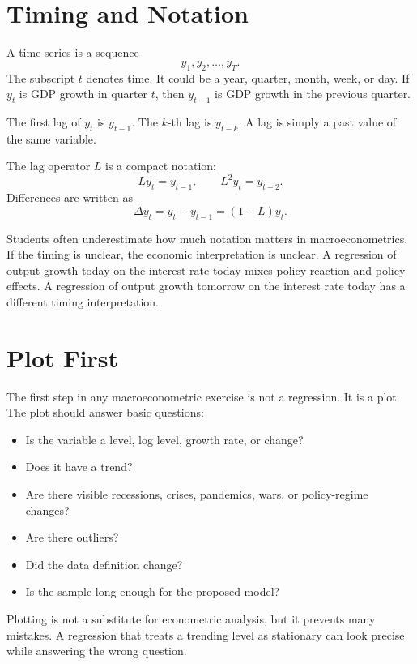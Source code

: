 \section{Timing and Notation}

A time series is a sequence
\[
    y_1,y_2,\ldots,y_T.
\]
The subscript \(t\) denotes time. It could be a year, quarter, month, week, or day. If \(y_t\) is GDP growth in quarter \(t\), then \(y_{t-1}\) is GDP growth in the previous quarter.

\begin{defN}[Lag]
The first lag of \(y_t\) is \(y_{t-1}\). The \(k\)-th lag is \(y_{t-k}\). A lag is simply a past value of the same variable.
\end{defN}

The lag operator \(L\) is a compact notation:
\[
    Ly_t=y_{t-1},\qquad L^2y_t=y_{t-2}.
\]
Differences are written as
\[
    \Delta y_t=y_t-y_{t-1}=(1-L)y_t.
\]

Students often underestimate how much notation matters in macroeconometrics. If the timing is unclear, the economic interpretation is unclear. A regression of output growth today on the interest rate today mixes policy reaction and policy effects. A regression of output growth tomorrow on the interest rate today has a different timing interpretation.

\section{Plot First}

The first step in any macroeconometric exercise is not a regression. It is a plot. The plot should answer basic questions:
\begin{itemize}
    \item Is the variable a level, log level, growth rate, or change?
    \item Does it have a trend?
    \item Are there visible recessions, crises, pandemics, wars, or policy-regime changes?
    \item Are there outliers?
    \item Did the data definition change?
    \item Is the sample long enough for the proposed model?
\end{itemize}

Plotting is not a substitute for econometric analysis, but it prevents many mistakes. A regression that treats a trending level as stationary can look precise while answering the wrong question.

